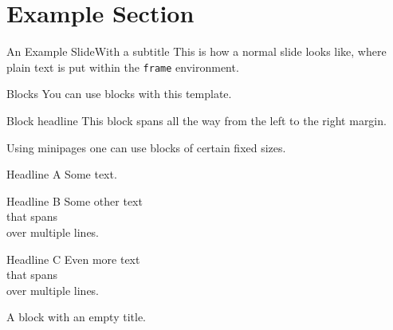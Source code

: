 %
%
%

\section{Example Section}
\begin{frame}[t]{An Example Slide}{With a subtitle}
	This is how a normal slide looks like, where plain text is put within the \texttt{frame} environment.
\end{frame}
%
%
%
%
%
\begin{frame}[t]{Blocks}{}
	You can use blocks with this template.
	\begin{block}{Block headline}
		This block spans all the way from the left to the right margin.
	\end{block}
	Using minipages one can use blocks of certain fixed sizes.\\
	\noindent%
	\begin{minipage}[t]{0.45\textwidth}
		\begin{block}{Headline A}
			Some text.
		\end{block}
	\end{minipage}
	\hfill%
	\begin{minipage}[t]{0.2\textwidth}
		\begin{block}{Headline B}
			Some other text\\
			that spans\\
			over multiple lines.
		\end{block}
	\end{minipage}
	\hfill%
	\begin{minipage}[t]{0.2\textwidth}
		\begin{block}{Headline C}
			Even more text\\
			that spans\\
			over multiple lines.
		\end{block}
	\end{minipage}

	\begin{block}{}
		A block with an empty title.
	\end{block}

\end{frame}

